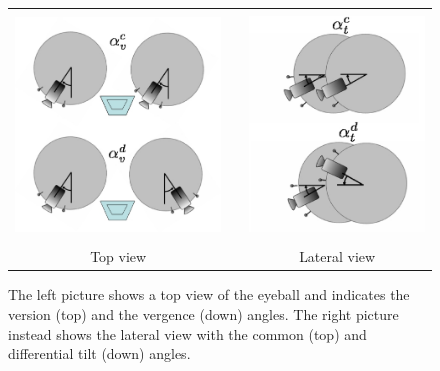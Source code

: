 \begin{figure}
  \begin{center}
  \begin{tabular}{ccc}
  \parbox{60mm}{\includegraphics[height=60mm]{Figure/EyeVergenceVersion.eps}}  & &
  \parbox{60mm}{\includegraphics[height=60mm]{Figure/EyeCommDiffTilt.eps}}\\
  Top view & & Lateral view
  \end{tabular}
  \end{center}
  \caption{The left picture shows a top view of the eyeball and indicates the version (top) and the vergence (down) angles. The right picture instead shows the lateral view with the common (top) and differential tilt (down) angles.}\label{Fig:EyeCoordinatedMovements}
 \end{figure}

